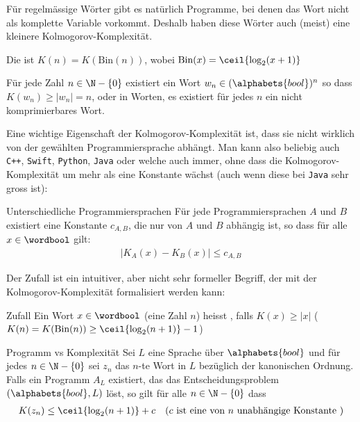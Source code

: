 \proven


Für regelmässige Wörter gibt es natürlich Programme, bei denen das Wort nicht als komplette Variable vorkommt.
Deshalb haben diese Wörter auch (meist) eine kleinere Kolmogorov-Komplexität.


 Die  ist $K(n) = K(\text{Bin}(n))$,
wobei $\text{Bin}(x) = \ceil{\log_2(x + 1)}$ %

\inlinelemma Für jede Zahl $n \in \N - \{ 0 \}$ existiert ein Wort $w_n \in (\alphabets{bool})^n$ so dass $K(w_n) \geq |w_n| = n$, oder in Worten, es existiert für jedes $n$ ein nicht komprimierbares Wort.

Eine wichtige Eigenschaft der Kolmogorov-Komplexität ist, dass sie nicht wirklich von der gewählten Programmiersprache abhängt.
Man kann also beliebig auch \texttt{C++}, \texttt{Swift}, \texttt{Python}, \texttt{Java} oder welche auch immer, ohne dass die Kolmogorov-Komplexität um mehr als eine Konstante wächst (auch wenn diese bei \texttt{Java} sehr gross ist):

\begin{theorem}[]{Unterschiedliche Programmiersprachen}
	Für jede Programmiersprachen $A$ und $B$ existiert eine Konstante $c_{A,B}$, die nur von $A$ und $B$ abhängig ist, so dass für alle $x \in \wordbool$ gilt:
	\begin{align*}
		|K_A(x) - K_B(x)| \leq c_{A, B}
	\end{align*}
\end{theorem}


 Der Zufall ist ein intuitiver, aber nicht sehr formeller Begriff, der mit der Kolmogorov-Komplexität formalisiert werden kann:
\begin{definition}[]{Zufall}
    Ein Wort $x \in \wordbool$ (eine Zahl $n$) heisst , falls $K(x) \geq |x|$ ($K(n) = K(\text{Bin}(n)) \geq \ceil{\log_2(n + 1)} - 1$)
\end{definition}

\begin{theorem}[]{Programm vs Komplexität}
    Sei $L$ eine Sprache über $\alphabets{bool}$ und für jedes $n \in \N - \{0\}$ sei $z_n$ das $n$-te Wort in $L$ bezüglich der kanonischen Ordnung.
    Falls ein Programm $A_L$ existiert, das das Entscheidungsproblem $(\alphabets{bool}, L)$ löst, so gilt für alle $n \in \N - \{ 0 \}$ dass
    \begin{align*}
        K(z_n) \leq \ceil{\log_2(n + 1)} + c & & (c \text{ ist eine von } n \text{ unabhängige Konstante })
    \end{align*}
\end{theorem}

